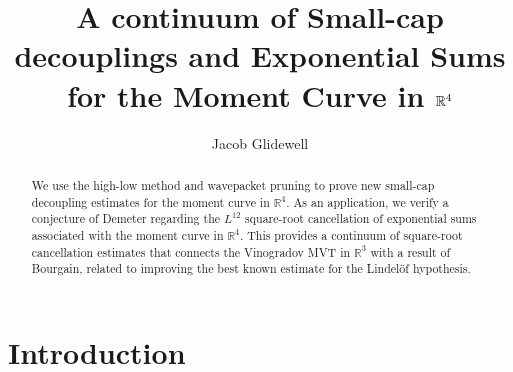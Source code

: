 \documentclass[12pt]{amsart}
\title[Small-Cap Decoupling in $\R^4$]{A continuum of Small-cap decouplings and Exponential Sums for the Moment Curve in $\R^4$}
\author{Jacob Glidewell}
\providecommand{\R}{\mathbb R}
\begin{document}
\begin{abstract}
    We use the high-low method and wavepacket pruning to prove new small-cap decoupling estimates for the moment curve in $\R^4$. As an application, we verify a conjecture of Demeter regarding the $L^{12}$ square-root cancellation of exponential sums associated with the moment curve in $\R^4$. This provides a continuum of square-root cancellation estimates that connects the Vinogradov MVT in $\R^3$ with a result of Bourgain, related to improving the best known estimate for the Lindel\"{o}f hypothesis. 
\end{abstract}


\maketitle

\section{Introduction}
\end{document}
